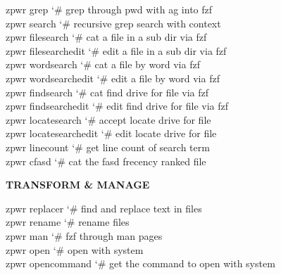 \documentclass[11pt,a4paper,twoside]{book}
\begin{document}
\begin{codebox}
\color{neongreen}zpwr grep                  {\char`\#} grep through pwd with ag into fzf\\
\color{neongreen}zpwr search                {\char`\#} recursive grep search with context\\
\color{neongreen}zpwr filesearch            {\char`\#} cat a file in a sub dir via fzf\\
\color{neongreen}zpwr filesearchedit        {\char`\#} edit a file in a sub dir via fzf\\
\color{neongreen}zpwr wordsearch            {\char`\#} cat a file by word via fzf\\
\color{neongreen}zpwr wordsearchedit        {\char`\#} edit a file by word via fzf\\
\color{neongreen}zpwr findsearch            {\char`\#} cat find drive for file via fzf\\
\color{neongreen}zpwr findsearchedit        {\char`\#} edit find drive for file via fzf\\
\color{neongreen}zpwr locatesearch          {\char`\#} accept locate drive for file\\
\color{neongreen}zpwr locatesearchedit      {\char`\#} edit locate drive for file\\
\color{neongreen}zpwr linecount             {\char`\#} get line count of search term\\
\color{neongreen}zpwr cfasd                 {\char`\#} cat the fasd frecency ranked file\\
\end{codebox}


\vspace{12pt}
{\bfseries\color{neonyellow} TRANSFORM \& MANAGE}\vspace{4pt}

\begin{codebox}
\color{neongreen}zpwr replacer              {\char`\#} find and replace text in files\\
\color{neongreen}zpwr rename                {\char`\#} rename files\\
\color{neongreen}zpwr man                   {\char`\#} fzf through man pages\\
\color{neongreen}zpwr open                  {\char`\#} open with system\\
\color{neongreen}zpwr opencommand           {\char`\#} get the command to open with system\\
\end{codebox}
\end{document}

